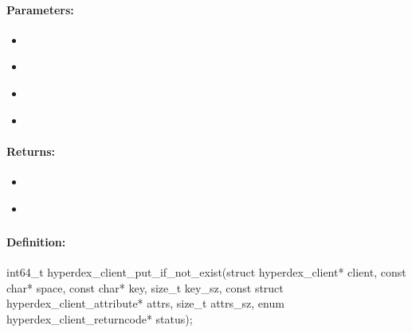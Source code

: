 \paragraph{Parameters:}
\begin{itemize}[noitemsep]
\item {}\\

\item {}\\

\item {}\\

\item {}\\

\end{itemize}

\paragraph{Returns:}
\begin{itemize}[noitemsep]
\item {}\\

\item {}\\

\end{itemize}

\pagebreak
\subsubsection{}
\label{api:c:put_if_not_exist}


\paragraph{Definition:}
\begin{ccode}
int64_t hyperdex_client_put_if_not_exist(struct hyperdex_client* client,
        const char* space,
        const char* key, size_t key_sz,
        const struct hyperdex_client_attribute* attrs, size_t attrs_sz,
        enum hyperdex_client_returncode* status);
\end{ccode}

